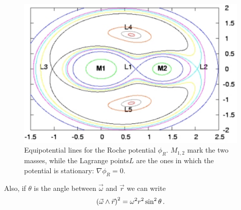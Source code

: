 \documentclass[main.tex]{subfiles}
\begin{document}

\begin{figure}[ht]
\centering
\includegraphics[width=\textwidth]{figures/roche-equipotential}
\caption{Equipotential lines for the Roche potential \(\phi _R\). \(M_{1, 2}\) mark the two masses, while the Lagrange points\(L\) are the ones in which the potential is stationary: \(\nabla \phi _R = 0\).}
\label{fig:roche-equipotential}
\end{figure}

%
%

Also, if \(\theta \) is the angle between \(\vec{\omega}\) and \(\vec{r}\) we can write 
%
\begin{align}
\qty(\vec{\omega} \wedge \vec{r})^2 = \omega^2 r^2 \sin^2 \theta 
\,.
\end{align}
\end{document}

